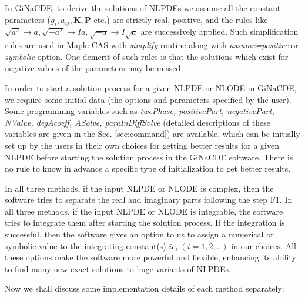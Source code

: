 \documentclass[prd,aps,floats,showkeys,nofootinbib,notitlepage]{revtex4}
\begin{document}
	In GiNaCDE, to derive the solutions of NLPDEs we assume all the constant parameters ($g_i,a_{ij},\boldsymbol{K},\boldsymbol{P}$ etc.) are strictly real, positive, and the rules like $\sqrt{a^2}\rightarrow a,\sqrt{-a^2}\rightarrow Ia, \sqrt{-a}\rightarrow I\sqrt{a}$ are successively applied. Such simplification rules are used in {Maple} CAS with {\em simplify} routine along with {\em assume=positive} or {\em symbolic} option. One demerit of such rules is that the solutions which exist for negative values of the parameters may be missed. 
	
	In order to start a solution process for a given NLPDE or NLODE in GiNaCDE, we require some initial data (the options and parameters specified by the user). Some programming variables such as \textit{twcPhase, positivePart, negativePart, NValue,  degAcoeff, ASolve, paraInDiffSolve} (detailed descriptions of these variables are given in the Sec. \ref{sec:command}) are available, which can be initially set up by the users in their own choices for getting better results for a given NLPDE before starting the solution process in the GiNaCDE software. There is no rule to know in advance a specific type of initialization to get better results.
	
	In all three methods, if the input NLPDE or NLODE  is complex, then the software tries to separate the real and imaginary parts following the step F1.
	In all three methods, if the input NLPDE or NLODE is integrable, the software tries to integrate them after starting the solution process. If the integration is successful, then the software gives an option to us to assign a numerical or symbolic value to the integrating constant(s) $ic_i\;(i=1,2,..)$ in our choices. All these options make the software more powerful and flexible, enhancing its ability to find many new exact solutions to huge variants of NLPDEs.
	
	Now we shall discuss some implementation details of each method separately:
	
\end{document}
